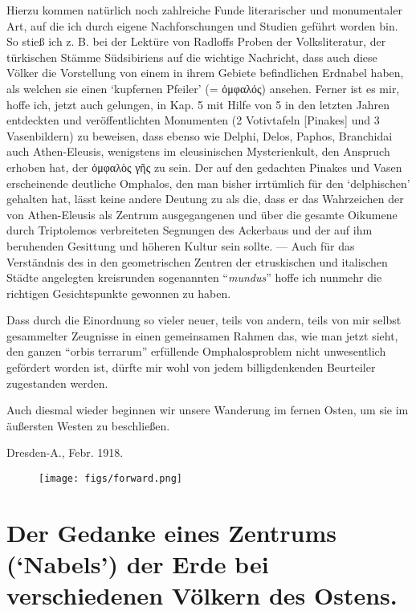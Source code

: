 \documentclass[a4paper, 11pt, oneside]{article}
\begin{document}
Hierzu kommen natürlich noch zahlreiche Funde literarischer und monumentaler Art, auf die ich durch eigene Nachforschungen und Studien geführt worden bin. So stieß ich z. B. bei der Lektüre von Radloffs Proben der Volksliteratur, der türkischen Stämme Südsibiriens auf die wichtige Nachricht, dass auch diese Völker die Vorstellung von einem in ihrem Gebiete befindlichen Erdnabel haben, als welchen sie einen `kupfernen Pfeiler' (= ὀμφαλός) ansehen. Ferner ist es mir, hoffe ich, jetzt auch gelungen, in Kap. 5 mit Hilfe von 5 in den letzten Jahren entdeckten und veröffentlichten Monumenten (2 Votivtafeln [Pinakes] und 3 Vasenbildern) zu beweisen, dass ebenso wie Delphi, Delos, Paphos, Branchidai auch Athen-Eleusis, wenigstens im eleusinischen Mysterienkult, den Anspruch erhoben hat, der ὀμφαλὸς γῆς zu sein. Der auf den gedachten Pinakes und Vasen erscheinende deutliche Omphalos, den man bisher irrtümlich für den `delphischen' gehalten hat, lässt keine andere Deutung zu als die, dass er das Wahrzeichen der von Athen-Eleusis als Zentrum ausgegangenen und über die gesamte Oikumene durch Triptolemos verbreiteten Segnungen des Ackerbaus und der auf ihm beruhenden Gesittung und höheren Kultur sein sollte. --- Auch für das Verständnis des in den geometrischen Zentren der etruskischen und italischen Städte angelegten kreisrunden sogenannten "`\emph{mundus}"' hoffe ich nunmehr die richtigen Gesichtspunkte gewonnen zu haben.

Dass durch die Einordnung so vieler neuer, teils von andern, teils von mir selbst gesammelter Zeugnisse in einen gemeinsamen Rahmen das, wie man jetzt sieht, den ganzen "`orbis terrarum"' erfüllende Omphalosproblem nicht unwesentlich gefördert worden ist, dürfte mir wohl von jedem billigdenkenden Beurteiler zugestanden werden.

Auch diesmal wieder beginnen wir unsere Wanderung im fernen Osten, um sie im äußersten Westen zu beschließen.

Dresden-A., Febr. 1918.
\clearpage
\vspace*{\fill}
\begin{figure}[H]
\centering
\texttt{[image: figs/forward.png]}
\caption*{}
\end{figure}
\vspace*{\fill}
\clearpage
\section{Der Gedanke eines Zentrums (`Nabels') der Erde bei verschiedenen Völkern des Ostens.}
\end{document}
